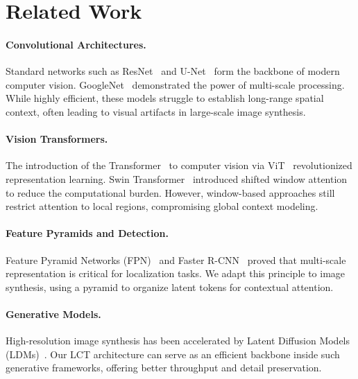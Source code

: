 \section{Related Work}
\paragraph{Convolutional Architectures.} Standard networks such as ResNet~\cite{he2016deep} and U-Net~\cite{ronneberger2015u} form the backbone of modern computer vision. GoogleNet~\cite{szegedy2015going} demonstrated the power of multi-scale processing. While highly efficient, these models struggle to establish long-range spatial context, often leading to visual artifacts in large-scale image synthesis.

\paragraph{Vision Transformers.} The introduction of the Transformer~\cite{vaswani2017attention} to computer vision via ViT~\cite{dosovitskiy2020image} revolutionized representation learning. Swin Transformer~\cite{liu2021swin} introduced shifted window attention to reduce the computational burden. However, window-based approaches still restrict attention to local regions, compromising global context modeling.

\paragraph{Feature Pyramids and Detection.} Feature Pyramid Networks (FPN)~\cite{lin2017feature} and Faster R-CNN~\cite{ren2015faster} proved that multi-scale representation is critical for localization tasks. We adapt this principle to image synthesis, using a pyramid to organize latent tokens for contextual attention.

\paragraph{Generative Models.} High-resolution image synthesis has been accelerated by Latent Diffusion Models (LDMs)~\cite{rombach2022high}. Our LCT architecture can serve as an efficient backbone inside such generative frameworks, offering better throughput and detail preservation.
